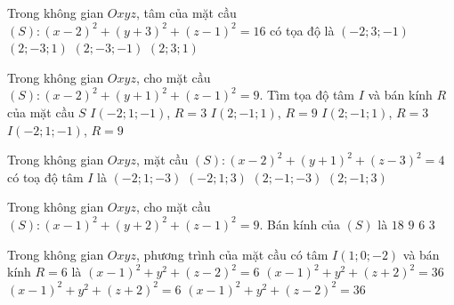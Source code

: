 \begin{ex}%
	Trong không gian $Oxyz$, tâm của mặt cầu $(S):(x-2)^2+(y+3)^2+(z-1)^2=16$ có tọa  độ là
	\choice 
		 {$(-2; 3;-1)$}
		 {\True $(2;-3; 1)$}
		 {$(2;-3;-1)$}
		{$(2; 3;  1)$}
\end{ex}

\begin{ex}%
	Trong không gian $Oxyz$, cho mặt cầu $(S)\colon (x-2)^2+(y+1)^2+(z-1)^2=9$. Tìm tọa  độ tâm $I$ và bán kính $R$ của mặt cầu $S$
	 \choice
		{$I(-2; 1;-1)$, $R=3$} 
		{$I(2;-1;  1)$, $R=9$}
		{\True $I(2;-1; 1)$,  $R=3$}
		{$I(-2; 1;-1)$,  $R=9$}
\end{ex}

\begin{ex}%
	Trong không gian $Oxyz$, mặt cầu $(S)\colon (x - 2)^2 + (y + 1)^2 + (z - 3)^2 = 4$ có toạ độ tâm  $I$ là
	\choice 
		 {$(-2;1;-3)$}
		 {$(-2;1;3)$}
		{$(2;-1;-3)$} 
		{\True  $(2;-1;3)$}
\end{ex}

\begin{ex}%
	Trong không gian $Oxyz$, cho mặt cầu $(S)\colon (x - 1)^2 + (y + 2)^2 +  (z - 1)^2 = 9$. Bán kính của $(S)$ là
	 \choice
		{$18$} 
		{$9$} 
		 {$6$}
		{\True  $3$}
\end{ex}

\begin{ex}%
	Trong không gian $Oxyz$, phương trình của mặt cầu có tâm $I(1;0;-2)$ và bán kính $R=6$  là
	 \choice
		 {$(x-1)^{2}+y^{2}+(z-2)^{2}=6$}
		 {\True $(x-1)^{2}+y^{2}+(z+2)^{2}=36$}
		 {$(x-1)^{2}+y^{2}+(z+2)^{2}=6$}
		{$(x-1)^{2}+y^{2}+(z-2)^{2}=36$} 
\end{ex}

